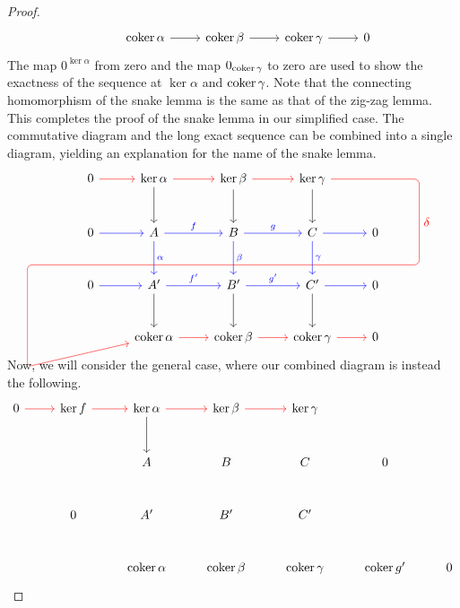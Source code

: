 \documentclass[a4paper,12pt]{article}
\begin{document}
\begin{proof}
\[\begin{tikzcd}
        & \coker \alpha \ar[r] & \coker \beta \ar[r] & \coker \gamma \ar[r] & 0
    \end{tikzcd}\]
    The map $0^{\ker \alpha}$ from zero and the map $0_{\operatorname{coker} \gamma}$ to zero are used to show the exactness of the sequence at $\ker \alpha$ and $\operatorname{coker} \gamma$.
    Note that the connecting homomorphism of the snake lemma is the same as that of the zig-zag lemma.
    This completes the proof of the snake lemma in our simplified case.
    The commutative diagram and the long exact sequence can be combined into a single diagram, yielding an explanation for the name of the snake lemma.
    \[\begin{tikzcd}[row sep=large]
	0 & {\ker \alpha} & {\ker \beta} & {\ker \gamma} & \\
	0 & A & B & C & 0 \\
	0 & {A'} & {B'} & {C'} & 0 \\
	& {\coker \alpha} & {\coker \beta} & {\coker  \gamma} & 0
	\arrow[from=1-1, to=1-2, red]
	\arrow[from=1-2, to=1-3, red]
	\arrow[from=1-2, to=2-2]
	\arrow[from=1-3, to=1-4, red]
	\arrow[from=1-3, to=2-3]
	\arrow[from=1-4, to=2-4]
    \arrow[from=1-4, to=4-2, overlay, red, rounded corners, to path={-- ++(3.0,0) -- ++(0,-2.4) node[midway,right]{\(\delta\)} -- ++(-11,0) -- ++(0,-2.85) -- (\tikztotarget)}]
	\arrow[from=2-1, to=2-2, blue]
    \arrow["f", from=2-2, to=2-3, blue]
	\arrow["\alpha", from=2-2, to=3-2, blue]
	\arrow["g", from=2-3, to=2-4, blue]
	\arrow["\beta", from=2-3, to=3-3, blue]
	\arrow[from=2-4, to=2-5, blue]
	\arrow["\gamma", from=2-4, to=3-4, blue]
	\arrow[from=3-1, to=3-2, blue]
	\arrow["{{f'}}", from=3-2, to=3-3, blue]
	\arrow[from=3-2, to=4-2]
	\arrow["{{g'}}", from=3-3, to=3-4, blue]
	\arrow[from=3-3, to=4-3]
    \arrow[from=3-4, to=3-5, blue]
	\arrow[from=3-4, to=4-4]
	\arrow[from=4-2, to=4-3, red]
	\arrow[from=4-3, to=4-4, red]
	\arrow[from=4-4, to=4-5, red]
    \end{tikzcd}\]
    Now, we will consider the general case, where our combined diagram is instead the following.
    \[\begin{tikzcd}[row sep=large]
	0 & {\ker f} & {\ker \alpha} & {\ker \beta} & {\ker \gamma} && \\
	&& A & B & C & 0 \\
	& 0 & {A'} & {B'} & {C'} \\
	&& {\coker \alpha} & {\coker \beta} & {\coker  \gamma} & {\coker g'} & 0
	\arrow[from=1-1, to=1-2, red]
	\arrow[from=1-2, to=1-3, red]
	\arrow[from=1-3, to=1-4, red]
	\arrow[from=1-3, to=2-3]
	\arrow[from=1-4, to=1-5, red]

\end{tikzcd}\]
\end{proof}
\end{document}
